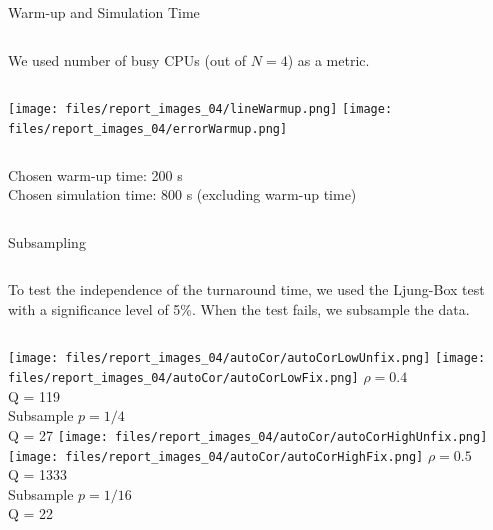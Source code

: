 \documentclass[aspectratio=169,xcolor=dvipsnames]{beamer}
\begin{document}

\begin{frame}{Warm-up and Simulation Time}
    \begin{columns}[c]
        We used number of busy CPUs (out of $N = 4$) as a metric.
    \end{columns}
    \begin{columns}[c] %
        \texttt{[image: files/report\_images\_04/lineWarmup.png]}
        \texttt{[image: files/report\_images\_04/errorWarmup.png]}
    \end{columns}
    \begin{columns}[c]
        \begin{block}{}
            Chosen warm-up time: 200 s\\
            Chosen simulation time: 800 s (excluding warm-up time)
        \end{block}
    \end{columns}
\end{frame}


\begin{frame}{Subsampling}
    \begin{columns}[c]
        To test the independence of the turnaround time, we used the Ljung-Box test with a significance level of 5\%.
        When the test fails, we subsample the data.
    \end{columns}
    \begin{columns}[c]
        \texttt{[image: files/report\_images\_04/autoCor/autoCorLowUnfix.png]}
        \texttt{[image: files/report\_images\_04/autoCor/autoCorLowFix.png]}
        $\rho=0.4$\\Q = 119\\
        \vspace{.35\textheight}
        Subsample $p=1/4$\\Q = 27
        \texttt{[image: files/report\_images\_04/autoCor/autoCorHighUnfix.png]}
        \texttt{[image: files/report\_images\_04/autoCor/autoCorHighFix.png]}
        $\rho=0.5$\\Q = 1333\\
        \vspace{.35\textheight}
        Subsample $p=1/16$\\Q = 22
    \end{columns}
\end{frame}
\end{document}
